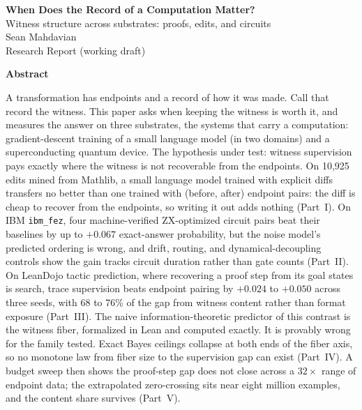 \documentclass[11pt,letterpaper]{article}
\begin{document}
\thispagestyle{empty}
\begin{center}
\vspace*{2.2in}
{\LARGE\bfseries When Does the Record of a Computation Matter?\\[0.35em]}
{\large Witness structure across substrates: proofs, edits, and circuits\\[2.2em]}
{\large Sean Mahdavian\\[0.6em]}
{\normalsize Research Report (working draft)}
\vfill
\end{center}
\clearpage

\thispagestyle{empty}
\begin{center}{\large\bfseries Abstract}\end{center}
\noindent
A transformation has endpoints and a record of how it was made.
Call that record the witness.
This paper asks when keeping the witness is worth it, and measures the answer on three substrates, the systems that carry a computation: gradient-descent training of a small language model (in two domains) and a superconducting quantum device.
The hypothesis under test: witness supervision pays exactly where the witness is not recoverable from the endpoints.
On 10{,}925 edits mined from Mathlib, a small language model trained with explicit diffs transfers no better than one trained with (before, after) endpoint pairs: the diff is cheap to recover from the endpoints, so writing it out adds nothing (Part~I).
On IBM \texttt{ibm\_fez}, four machine-verified ZX-optimized circuit pairs beat their baselines by up to $+0.067$ exact-answer probability, but the noise model's predicted ordering is wrong, and drift, routing, and dynamical-decoupling controls show the gain tracks circuit duration rather than gate counts (Part~II).
On LeanDojo tactic prediction, where recovering a proof step from its goal states is search, trace supervision beats endpoint pairing by $+0.024$ to $+0.050$ across three seeds, with 68 to 76\% of the gap from witness content rather than format exposure (Part~III).
The naive information-theoretic predictor of this contrast is the witness fiber, formalized in Lean and computed exactly.
It is provably wrong for the family tested.
Exact Bayes ceilings collapse at both ends of the fiber axis, so no monotone law from fiber size to the supervision gap can exist (Part~IV).
A budget sweep then shows the proof-step gap does not close across a $32\times$ range of endpoint data; the extrapolated zero-crossing sits near eight million examples, and the content share survives (Part~V).
\end{document}
